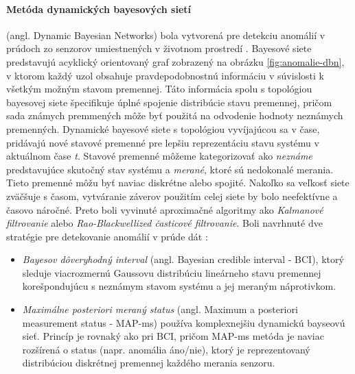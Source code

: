 \paragraph{Metóda dynamických bayesových sietí} (angl. Dynamic Bayesian Networks) bola vytvorená pre detekciu anomálií v prúdoch zo senzorov umiestnených v životnom prostredí \citep{hill2007real}. Bayesové siete predstavujú acyklický orientovaný graf zobrazený na obrázku \ref{fig:anomalie-dbn}, v ktorom každý uzol obsahuje pravdepodobnostnú informáciu v súvislosti k všetkým možným stavom premennej. Táto informácia spolu s topológiou bayesovej siete špecifikuje úplné spojenie distribúcie stavu premennej, pričom sada známych premmených môže byť použitá na odvodenie hodnoty neznámych premenných. Dynamické bayesové siete s topológiou vyvíjajúcou sa v čase, pridávajú nové stavové premenné pre lepšiu reprezentáciu stavu systému v aktuálnom čase \textit{t}. Stavové premenné môžeme kategorizovať ako \textit{neznáme} predstavujúce skutočný stav systému a \textit{merané}, ktoré sú nedokonalé merania. Tieto premenné môžu byť naviac diskrétne alebo spojité. Nakoľko sa veľkosť siete zväčšuje s časom, vytváranie záverov použitím celej siete by bolo neefektívne a časovo náročné. Preto boli vyvinuté aproximačné algoritmy ako \textit{Kalmanové filtrovanie} alebo \textit{Rao-Blackwellized časticové filtrovanie}. Boli navrhnuté dve stratégie pre detekovanie anomálií v prúde dát \citep{hill2007real}:
\begin{itemize}
	\item \textit{Bayesov dôveryhodný interval} (angl. Bayesian credible interval - BCI), ktorý sleduje viacrozmernú Gaussovu distribúciu lineárneho stavu premennej korešpondujúcu s neznámym stavom systému a jej meraným náprotivkom.
	\item \textit{Maximálne posteriori meraný status} (angl. Maximum a posteriori measurement status - MAP-ms) používa komplexnejšiu dynamickú bayseovú sieť. Princíp je rovnaký ako pri BCI, pričom MAP-ms metóda je naviac rozšírená o status (napr. anomália áno/nie), ktorý je reprezentovaný distribúciou diskrétnej premennej každého merania senzoru.
\end{itemize}
\label{fig:anomalie-dbn}




